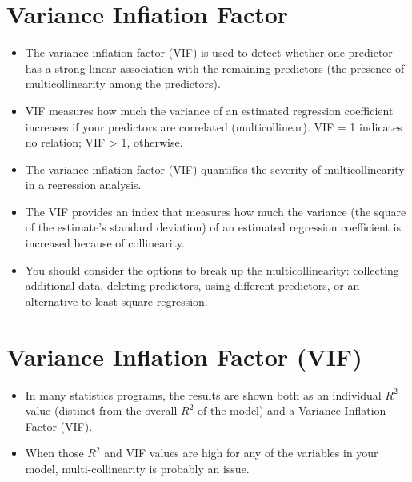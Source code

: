 \documentclass[a4paper,12pt]{article}
\begin{document}
\section*{Variance Infiation Factor}
\begin{itemize}
\item  The variance inflation factor (VIF) is used to detect whether one predictor has a strong linear association
with the remaining predictors (the presence of multicollinearity among the predictors).
\item  VIF measures how much the variance of an estimated regression coefficient increases if your predictors
are correlated (multicollinear). VIF = 1 indicates no relation; VIF > 1, otherwise.

\item  The variance inflation factor (VIF) quantifies the severity of multicollinearity in a regression analysis.
\item  The VIF provides an index that measures how much the variance (the square of the estimate's standard
deviation) of an estimated regression coefficient is increased because of collinearity.

\item  You should consider the options to break up the multicollinearity: collecting additional data, deleting predictors, using different predictors, or 
an alternative to least square regression.
\end{itemize}



\section*{Variance Inflation Factor (VIF)}
\begin{itemize}

\item In many statistics programs, the results are shown both
as an individual $R^2$ value (distinct from the overall $R^2$ of the model) and a Variance Inflation
Factor (VIF). 
\item When those $R^2$ and VIF values are high for any of the variables in your model,
multi-collinearity is probably an issue.

\end{itemize}




\end{document}

